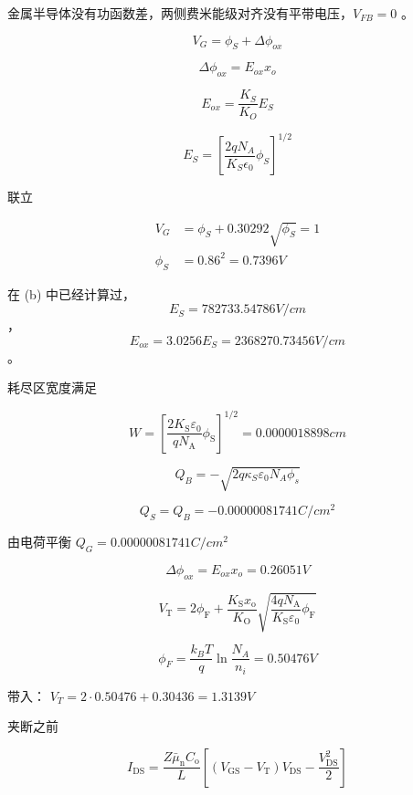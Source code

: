 \documentclass[lang=cn,11pt,a4paper,cite=authoryear]{elegantpaper}
\begin{document}


金属半导体没有功函数差，两侧费米能级对齐没有平带电压，\(V_{FB} = 0\) 。


\[V_G = \phi_S + \Delta \phi_{ox}\] 

\[\Delta \phi_{ox} = E_{ox} x_o \]

\[E_{ox} = \dfrac{K_S}{K_O}E_S\]

\[E_S = \left[\dfrac{2 q N_A}{K_S \epsilon_0} \phi_S\right]^{1/2}\] 

联立 

\[\begin{aligned}
    V_G &= \phi_S + 0.30292 \sqrt{\phi_S} = 1 \\
    \phi_S &= 0.86^2 = 0.7396 V
\end{aligned}\]


在 (b) 中已经计算过，\[E_S = 782733.54786 V/cm\] ，\[E_{ox} = 3.0256 E_S = 2368270.73456 V/cm\]。


耗尽区宽度满足

\[W=\left[\frac{2 K_{\mathrm{S}} \varepsilon_{0}}{q N_{\mathrm{A}}} \phi_{\mathrm{S}}\right]^{1 / 2} = 0.0000018898 cm\] 


\[Q_{B}=-\sqrt{2 q \kappa_{S} \varepsilon_{0} N_{A} \phi_{s}}\]

\[Q_S = Q_B =  -0.00000081741 C/cm^2\]


由电荷平衡 \(Q_G = 0.00000081741 C/cm^2\)


\[\Delta \phi_{ox} = E_{ox} x_o = 0.26051 V\]


\[V_{\mathrm{T}}=2 \phi_{\mathrm{F}}+\frac{K_{\mathrm{S}} x_{\mathrm{o}}}{K_{\mathrm{O}}} \sqrt{\frac{4 q N_{\mathrm{A}}}{K_{\mathrm{S}} \varepsilon_{0}} \phi_{\mathrm{F}}}\]

\[\phi_F = \frac{k_B T}{q} \ln {\frac{N_A}{n_i}} =  0.50476 V\]

带入： \(V_T = 2 \cdot  0.50476 + 0.30436 = 1.3139 V\) 



夹断之前

\[I_{\mathrm{DS}}=\frac{Z \bar{\mu}_{\mathrm{n}} C_{\mathrm{o}}}{L}\left[\left(V_{\mathrm{GS}}-V_{\mathrm{T}}\right) V_{\mathrm{DS}}-\frac{V_{\mathrm{DS}}^{2}}{2}\right]\]
\end{document}

